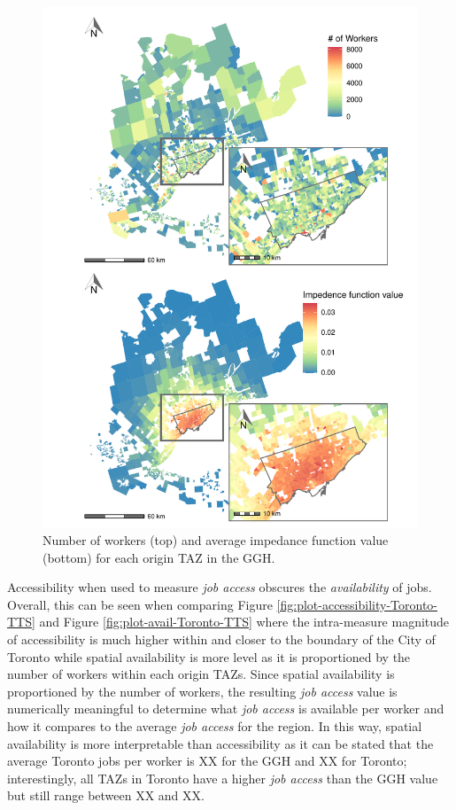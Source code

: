 \documentclass[]{elsarticle} %
\begin{document}
\begin{figure}
\includegraphics[width=1\linewidth]{Spatial-Availability_files/figure-latex/plot-workers-imp-1} \caption{\label{fig:plot-workers-imp}Number of workers (top) and average impedance function value (bottom) for each origin TAZ in the GGH.}\label{fig:plot-workers-imp}
\end{figure}

Accessibility when used to measure \emph{job access} obscures the
\emph{availability} of jobs. Overall, this can be seen when comparing
Figure \ref{fig:plot-accessibility-Toronto-TTS} and Figure
\ref{fig:plot-avail-Toronto-TTS} where the intra-measure magnitude of
accessibility is much higher within and closer to the boundary of the
City of Toronto while spatial availability is more level as it is
proportioned by the number of workers within each origin TAZs. Since
spatial availability is proportioned by the number of workers, the
resulting \emph{job access} value is numerically meaningful to determine
what \emph{job access} is available per worker and how it compares to
the average \emph{job access} for the region. In this way, spatial
availability is more interpretable than accessibility as it can be
stated that the average Toronto jobs per worker is XX for the GGH and XX
for Toronto; interestingly, all TAZs in Toronto have a higher \emph{job
access} than the GGH value but still range between XX and XX.
\end{document}
